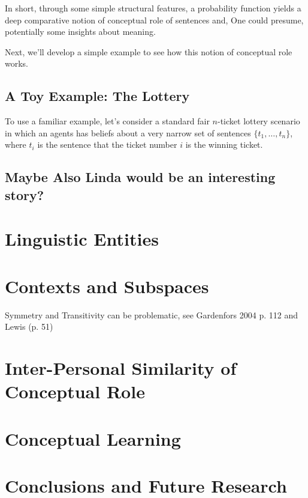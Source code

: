 \documentclass[11pt, a4paper]{article}
\begin{document}
In short, through some simple structural features, a probability function yields a deep comparative notion of conceptual role of sentences and, One could presume, potentially some insights about meaning.

Next, we'll develop a simple example to see how this notion of conceptual role works.

\subsection{A Toy Example: The Lottery}

To use a familiar example, let's consider a standard fair $n$-ticket lottery scenario in which an agents has beliefs about a very narrow set of sentences $\{ t_1, \ldots, t_n\}$, where $t_i$ is the sentence that the ticket number $i$ is the winning ticket.

\subsection{Maybe Also Linda would be an interesting story?}

\section{Linguistic Entities}
\section{Contexts and Subspaces}
Symmetry and Transitivity can be problematic, see Gardenfors 2004 p. 112 and Lewis (p. 51)
\section{Inter-Personal Similarity of Conceptual Role}
\section{Conceptual Learning}
\section{Conclusions and Future Research}

\nocite{*}
\printbibliography{}
\end{document}
